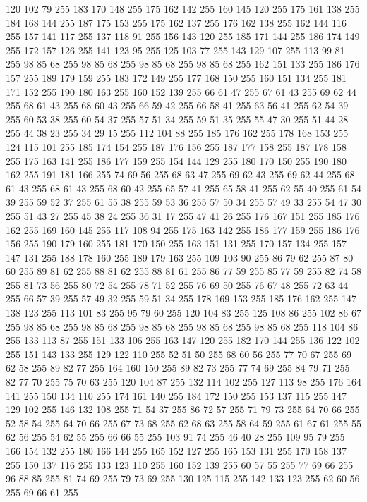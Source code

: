 120 102 79 255 183 170 148 255 175 162 142 255 160 145 120 255 175 161 138 255 184 168 144 255 187 175 153 255 175 162 137 255 176 162 138 255 162 144 116 255 157 141 117 255 137 118 91 255 156 143 120 255 185 171 144 255 186 174 149 255 172 157 126 255 141 123 95 255 125 103 77 255 143 129 107 255 113 99 81 255 98 85 68 255 98 85 68 255 98 85 68 255 98 85 68 255 162 151 133 255 186 176 157 255 189 179 159 255 183 172 149 255 177 168 150 255 160 151 134 255 181 171 152 255 190 180 163 255 160 152 139 255 66 61 47 255 67 61 43 255 69 62 44 255 68 61 43 255 68 60 43 255 66 59 42 255 66 58 41 255 63 56 41 255 62 54 39 255 60 53 38 255 60 54 37 255 57 51 34 255 59 51 35 255 55 47 30 255 51 44 28 255 44 38 23 255 34 29 15 255 112 104 88 255 185 176 162 255 178 168 153 255 124 115 101 255 185 174 154 255 187 176 156 255 187 177 158 255 187 178 158 255 175 163 141 255 186 177 159 255 154 144 129 255 180 170 150 255 190 180 162 255 191 181 166 255
74 69 56 255 68 63 47 255 69 62 43 255 69 62 44 255 68 61 43 255 68 61 43 255 68 60 42 255 65 57 41 255 65 58 41 255 62 55 40 255 61 54 39 255 59 52 37 255 61 55 38 255 59 53 36 255 57 50 34 255 57 49 33 255 54 47 30 255 51 43 27 255 45 38 24 255 36 31 17 255 47 41 26 255 176 167 151 255 185 176 162 255 169 160 145 255 117 108 94 255 175 163 142 255 186 177 159 255 186 176 156 255 190 179 160 255 181 170 150 255 163 151 131 255 170 157 134 255 157 147 131 255 188 178 160 255 189 179 163 255 109 103 90 255 86 79 62 255 87 80 60 255 89 81 62 255 88 81 62 255 88 81 61 255 86 77 59 255 85 77 59 255 82 74 58 255 81 73 56 255 80 72 54 255 78 71 52 255 76 69 50 255 76 67 48 255 72 63 44 255 66 57 39 255 57 49 32 255 59 51 34 255 178 169 153 255 185 176 162 255 147 138 123 255 113 101 83 255 95 79 60 255 120 104 83 255 125 108 86 255 102 86 67 255 98 85 68 255 98 85 68 255 98 85 68 255
98 85 68 255 98 85 68 255 118 104 86 255 133 113 87 255 151 133 106 255 163 147 120 255 182 170 144 255 136 122 102 255 151 143 133 255 129 122 110 255 52 51 50 255 68 60 56 255 77 70 67 255 69 62 58 255 89 82 77 255 164 160 150 255 89 82 73 255 77 74 69 255 84 79 71 255 82 77 70 255 75 70 63 255 120 104 87 255 132 114 102 255 127 113 98 255 176 164 141 255 150 134 110 255 174 161 140 255 184 172 150 255 153 137 115 255 147 129 102 255 146 132 108 255 71 54 37 255 86 72 57 255 71 79 73 255 64 70 66 255 52 58 54 255 64 70 66 255 67 73 68 255 62 68 63 255 58 64 59 255 61 67 61 255 55 62 56 255 54 62 55 255 66 66 55 255 103 91 74 255 46 40 28 255 109 95 79 255 166 154 132 255 180 166 144 255 165 152 127 255 165 153 131 255 170 158 137 255 150 137 116 255 133 123 110 255 160 152 139 255 60 57 55 255 77 69 66 255 96 88 85 255 81 74 69 255 79 73 69 255 130 125 115 255 142 133 123 255 62 60 56 255 69 66 61 255
